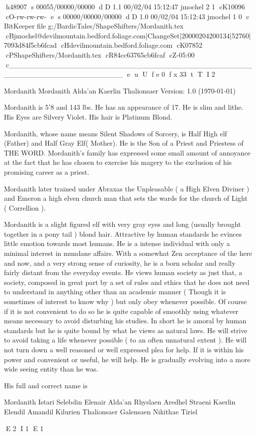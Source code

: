 h48907
s 00055/00000/00000
d D 1.1 00/02/04 15:12:47 jmochel 2 1
cK10096
cO-rw-rw-rw-
e
s 00000/00000/00000
d D 1.0 00/02/04 15:12:43 jmochel 1 0
c BitKeeper file g:/BardicTales/ShapeShifters/Mordanith.tex
cBjmochel@devilmountain.bedford.foliage.com|ChangeSet|20000204200134|52760|7093d84f5cb6fcad
cHdevilmountain.bedford.foliage.com
cK07852
cPShapeShifters/Mordanith.tex
cR84cc63765cb6fcaf
cZ-05:00
c______________________________________________________________________
e
u
U
f e 0
f x 33
t
T
I 2





\def\cnotice{}
\def\manualname{Character Description}

\manpage Mordanith
Mordanith Alda'an Kaerlin Thalionsaer
Version: 1.0 (\today)


Mordanith is 5'8 and 143 lbs. He has an appearance of 17. He is
slim and lithe. His Eyes are Silvery Violet. His hair is Platinum Blond.

Mordanith, whose name means Silent Shadows of Sorcery, is Half High
elf (Father) and Half Gray Elf( Mother). He is the Son of a Priest
and Priestess of THE WORD. Mordanith's family has expressed some
small amount of annoyance at the fact that he has chosen to exercise
his magery to the exclusion of his promising career as a priest.

Mordanith later trained under Abraxas the Unpleasable ( a High Elven
Diviner ) and Emeron a high elven church man that sets the wards for
the church of Light ( Correllion ).

Mordanith is a slight figured elf with very gray eyes and long
(usually brought together in a pony tail ) blond hair. Attractive by
human standards he evinces little emotion towards most humans. He is
a intense individual with only a minimal interest in mundane affairs.
With a somewhat Zen acceptance of the here and now, and a very strong
sense of curiosity, he is a born scholar and really fairly distant
from the everyday events. He views human society as just that, a
society, composed in great part by a set of rules and ethics that he
does not need to understand in anything other than an academic manner
( Though it is sometimes of interest to know why ) but only obey
whenever possible. Of course if it is not convenient to do so he is
quite capable of smoothly using whatever means necessary to avoid
disturbing his studies. In short he is amoral by human standards but
he is quite bound by what he views as natural laws. He will strive to
avoid taking a life whenever possible ( to an often unnatural extent ).
He will not turn down a well reasoned or well expressed plea for help.
If it is within his power and convenient or useful, he will help.
He is gradually evolving into a more wide seeing entity than he was.

His full and correct name is

Mordanith Istari Selebdin Elenair
Alda'an Rhyslaen Aredhel Straeni
Kaerlin Elendil Amandil Kilurien
Thalionsaer Galensaen Nikithae Tiriel


\bye
E 2
I 1
E 1
